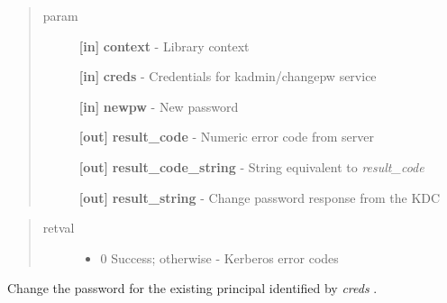 \documentclass[letterpaper,10pt,english]{sphinxmanual}
\begin{document}
\begin{fulllineitems}
\label{appdev/refs/api/krb5_change_password:krb5_change_password}
\end{fulllineitems}

\begin{quote}\begin{description}
\item[{param}] \leavevmode
\textbf{{[}in{]}} \textbf{context} - Library context

\textbf{{[}in{]}} \textbf{creds} - Credentials for kadmin/changepw service

\textbf{{[}in{]}} \textbf{newpw} - New password

\textbf{{[}out{]}} \textbf{result\_code} - Numeric error code from server

\textbf{{[}out{]}} \textbf{result\_code\_string} - String equivalent to \emph{result\_code}

\textbf{{[}out{]}} \textbf{result\_string} - Change password response from the KDC

\end{description}\end{quote}
\begin{quote}\begin{description}
\item[{retval}] \leavevmode\begin{itemize}
\item {} 
0   Success; otherwise - Kerberos error codes

\end{itemize}

\end{description}\end{quote}

Change the password for the existing principal identified by \emph{creds} .
\end{document}

